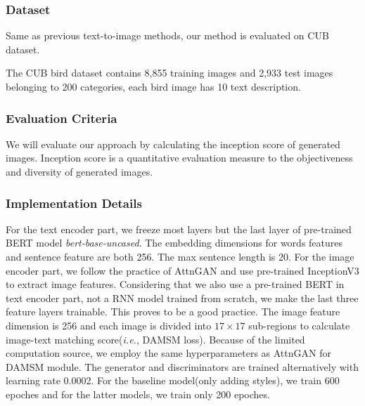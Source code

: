 \documentclass{article}
\begin{document}
\subsubsection{Dataset}

Same as previous text-to-image methods\cite{attngan,mirrorgan}, our method is evaluated on CUB dataset.\cite{WahCUB_200_2011}

The CUB bird dataset contains 8,855 training images and 2,933
test images belonging to 200 categories, each bird image has 10 text description.

\subsubsection{Evaluation Criteria}

We will evaluate our approach by calculating the inception score\cite{inception} of generated images. Inception score is a quantitative evaluation measure to the objectiveness and diversity of generated images.




\subsubsection{Implementation Details}
For the text encoder part, we freeze most layers but the last layer of pre-trained BERT model \textit{bert-base-uncased}. The embedding dimensions for words features and sentence feature are both 256. The max sentence length is 20. For the image encoder part, we follow the practice of AttnGAN\cite{attngan} and use pre-trained InceptionV3\cite{inception2} to extract image features. Considering that we also use a pre-trained BERT in text encoder part, not a RNN model trained from scratch, we make the last three feature layers trainable. This proves to be a good practice. The image feature dimension is 256 and each image is divided into $17 \times 17$ sub-regions to calculate image-text matching score(\textit{i.e.}, DAMSM loss). Because of the limited computation source, we employ the same hyperparameters as AttnGAN\cite{attngan} for DAMSM module. The generator and discriminators are trained alternatively with learning rate 0.0002. For the baseline model(only adding styles), we train 600 epoches and for the latter models, we train only 200 epoches.
\end{document}
